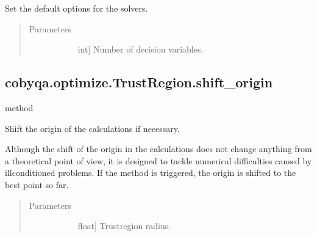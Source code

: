 \documentclass[letterpaper,10pt,english]{sphinxmanual}
\begin{document}
\begin{fulllineitems}
\begin{fulllineitems}
\label{\detokenize{refs/generated/cobyqa.optimize.TrustRegion.set_default_options:cobyqa.optimize.TrustRegion.set_default_options}}
\sphinxAtStartPar
Set the default options for the solvers.
\begin{quote}\begin{description}
\item[{Parameters}] \leavevmode\begin{description}
\item[{}] \leavevmode{[}int{]}
\sphinxAtStartPar
Number of decision variables.

\end{description}

\end{description}\end{quote}

\end{fulllineitems}



\subsection{cobyqa.optimize.TrustRegion.shift\_origin}
\label{\detokenize{refs/generated/cobyqa.optimize.TrustRegion.shift_origin:cobyqa-optimize-trustregion-shift-origin}}\label{\detokenize{refs/generated/cobyqa.optimize.TrustRegion.shift_origin::doc}}
\sphinxAtStartPar
method

\begin{fulllineitems}
\label{\detokenize{refs/generated/cobyqa.optimize.TrustRegion.shift_origin:cobyqa.optimize.TrustRegion.shift_origin}}
\sphinxAtStartPar
Shift the origin of the calculations if necessary.

\sphinxAtStartPar
Although the shift of the origin in the calculations does not change
anything from a theoretical point of view, it is designed to tackle
numerical difficulties caused by ill\sphinxhyphen{}conditioned problems. If the method
is triggered, the origin is shifted to the best point so far.
\begin{quote}\begin{description}
\item[{Parameters}] \leavevmode\begin{description}
\item[{}] \leavevmode{[}float{]}
\sphinxAtStartPar
Trust\sphinxhyphen{}region radius.


\end{description}
\end{description}
\end{quote}
\end{fulllineitems}
\end{fulllineitems}
\end{document}
